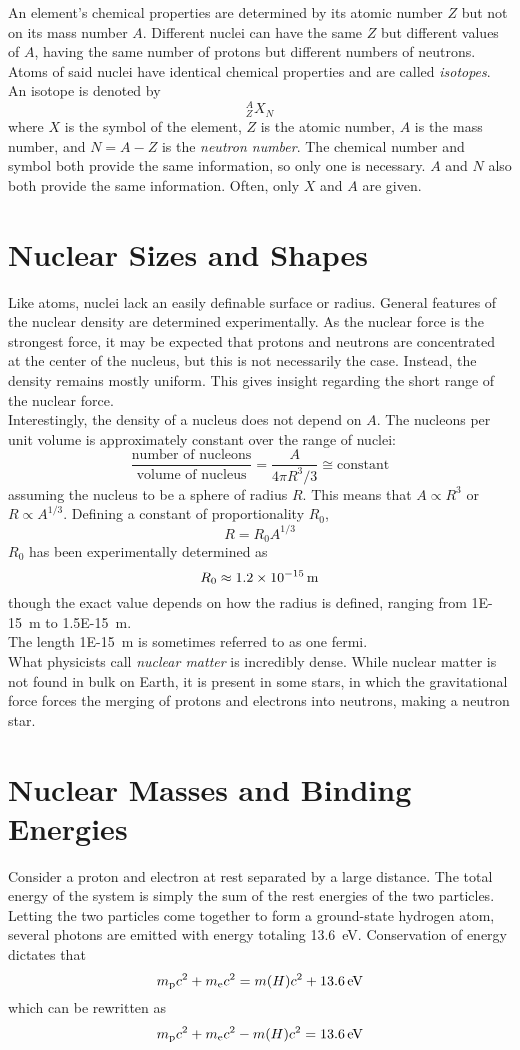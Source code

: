 \documentclass{subfiles}
\begin{document}
		An element's chemical properties are determined by its atomic number \(Z\) but not on its mass number \(A\). Different nuclei can have the same \(Z\) but different values of \(A\), having the same number of protons but different numbers of neutrons. Atoms of said nuclei have identical chemical properties and are called \textit{isotopes}. An isotope is denoted by
			\[^A_ZX_N\]
			where \(X\) is the symbol of the element, \(Z\) is the atomic number, \(A\) is the mass number, and \(N = A - Z\) is the \textit{neutron number}. The chemical number and symbol both provide the same information, so only one is necessary. \(A\) and \(N\) also both provide the same information. Often, only \(X\) and \(A\) are given.
	\section{Nuclear Sizes and Shapes}
		Like atoms, nuclei lack an easily definable surface or radius. General features of the nuclear density are determined experimentally. As the nuclear force is the strongest force, it may be expected that protons and neutrons are concentrated at the center of the nucleus, but this is not necessarily the case. Instead, the density remains mostly uniform. This gives insight regarding the short range of the nuclear force. \\
		Interestingly, the density of a nucleus does not depend on \(A\). The nucleons per unit volume is approximately constant over the range of nuclei:
			\[
				\frac{\text{number of nucleons}}{\text{volume of nucleus}} = \frac{A}{4\pi R^3/3}
					\cong \text{constant}
			\]
			assuming the nucleus to be a sphere of radius \(R\). This means that \(A \propto R^3\) or \(R \propto A^{1/3}\). Defining a constant of proportionality \(R_0\),
			\[R = R_0A^{1/3}\]
			\(R_0\) has been experimentally determined as
			\[R_0 \approx \SI{1.2E-15}{m}\]
			though the exact value depends on how the radius is defined, ranging from \SI{1E-15}{m} to \SI{1.5E-15}{m}. \\
			The length \SI{1E-15}{m} is sometimes referred to as one fermi. \\
		What physicists call \textit{nuclear matter} is incredibly dense. While nuclear matter is not found in bulk on Earth, it is present in some stars, in which the gravitational force forces the merging of protons and electrons into neutrons, making a neutron star.
	\section{Nuclear Masses and Binding Energies}
		Consider a proton and electron at rest separated by a large distance. The total energy of the system is simply the sum of the rest energies of the two particles. Letting the two particles come together to form a ground-state hydrogen atom, several photons are emitted with energy totaling \SI{13.6}{eV}. Conservation of energy dictates that
			\[m_{\text{p}}c^2 + m_{\text{e}}c^2 = m(H)c^2 + \SI{13.6}{eV}\]
			which can be rewritten as
			\[m_{\text{p}}c^2 + m_{\text{e}}c^2 - m(H)c^2 = \SI{13.6}{eV}\]
\end{document}
